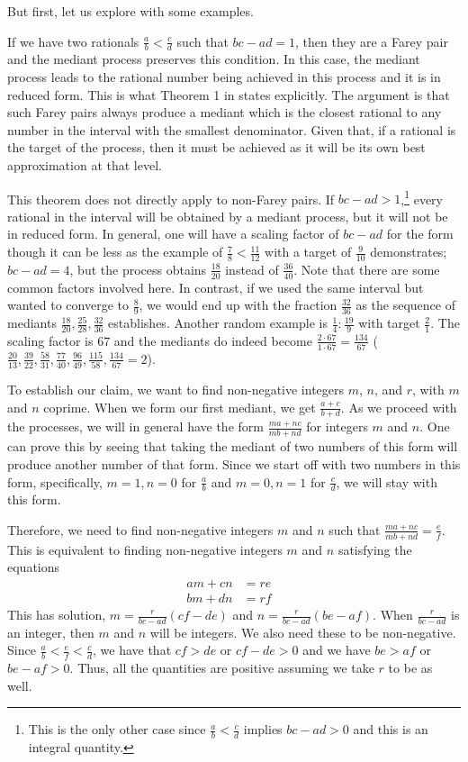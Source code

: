 \documentclass[12pt]{article}
\begin{document}
But first, let us explore with some examples. 

If we have two rationals $\frac{a}{b} < \frac{c}{d}$ such that $bc - ad = 1$, then they are a Farey pair and the mediant process preserves this condition. In this case, the mediant process leads to the rational number being achieved in this process and it is in reduced form. This is what Theorem 1 in \cite{richards} states explicitly. The argument is that such Farey pairs always produce a mediant which is the closest rational to any number in the interval with the smallest denominator. Given that, if a rational is the target of the process, then it must be achieved as it will be its own best approximation at that level. 

This theorem does not directly apply to non-Farey pairs. If $bc-ad > 1$,\footnote{This is the only other case since $\frac{a}{b} < \frac{c}{d}$ implies $bc - ad > 0$ and this is an integral quantity.} every rational in the interval will be obtained by a mediant process, but it will not be in reduced form. In general, one will have a scaling factor of $bc-ad$ for the form though it can be less as the example of $\frac{7}{8}< \frac{11}{12}$ with a target of $\frac{9}{10}$ demonstrates; $bc-ad = 4$, but the process obtains $\frac{18}{20}$ instead of $\frac{36}{40}$. Note that there are some common factors involved here. In contrast, if we used the same interval but wanted to converge to $\frac{8}{9}$, we would end up with the fraction $\frac{32}{36}$ as the sequence of mediants $\frac{18}{20}, \frac{25}{28}, \frac{32}{36}$ establishes. Another random example is  $\frac{1}{4} : \frac{19}{9}$ with target $\frac{2}{1}$. The scaling factor is $67$ and the mediants do indeed become $\frac{2 \cdot 67}{1 \cdot 67} = \frac{134}{67}$  ($\frac{20}{13}, \frac{39}{22}, \frac{58}{31}, \frac{77}{40}, \frac{96}{49}, \frac{115}{58}, \frac{134}{67} = 2$). 


To establish our claim, we want to find non-negative integers $m$, $n$, and $r$, with $m$ and $n$ coprime. When we form our first mediant, we get $\frac{a+c}{b+d}$. As we proceed with the processes, we will in general have the form $\frac{ma + nc}{mb + nd}$ for integers $m$ and $n$. One can prove this by seeing that taking the mediant of two numbers of this form will produce another number of that form. Since we start off with two numbers in this form, specifically, $m=1, n=0$ for $\frac{a}{b}$ and $m=0, n=1$ for $\frac{c}{d}$, we will stay with this form. 

Therefore, we need to find non-negative integers $m$ and $n$ such that $\frac{ma+nc}{mb+nd} = \frac{e}{f}$. This is equivalent to finding non-negative integers $m$ and $n$
satisfying the equations
\begin{align*}
    am + cn &= re & \\
    bm + dn &= rf & 
\end{align*}
This has solution, $m = \frac{r}{bc-ad} (cf-de)$ and $n= \frac{r}{bc-ad} (be-af)$. When $\frac{r}{bc-ad}$ is an integer, then $m$ and $n$ will be integers. We also need these to be non-negative. Since $\frac{a}{b} < \frac{e}{f} < \frac{c}{d}$, we have that $cf>de$ or $cf - de > 0$ and we have $be>af$ or $be - af > 0$. Thus, all the quantities are positive assuming we take $r$ to be as well. 
\end{document}
